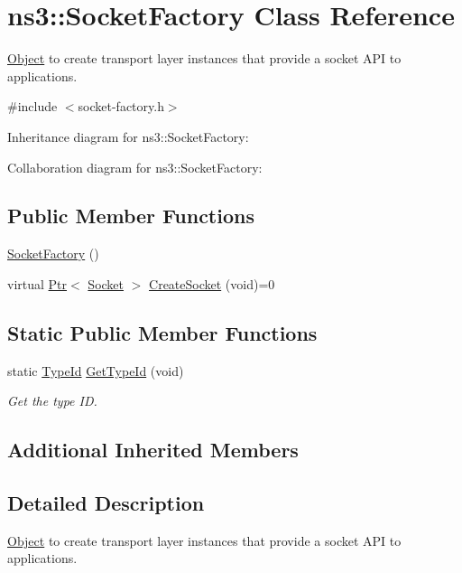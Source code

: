 \hypertarget{classns3_1_1SocketFactory}{}\section{ns3\+:\+:Socket\+Factory Class Reference}
\label{classns3_1_1SocketFactory}


\hyperlink{classns3_1_1Object}{Object} to create transport layer instances that provide a socket A\+PI to applications.  




{\ttfamily \#include $<$socket-\/factory.\+h$>$}



Inheritance diagram for ns3\+:\+:Socket\+Factory\+:


Collaboration diagram for ns3\+:\+:Socket\+Factory\+:
\subsection*{Public Member Functions}
\begin{DoxyCompactItemize}
\item 
\hyperlink{classns3_1_1SocketFactory_a98a41212740c38fb7db9ea698800f8cf}{Socket\+Factory} ()
\item 
virtual \hyperlink{classns3_1_1Ptr}{Ptr}$<$ \hyperlink{classns3_1_1Socket}{Socket} $>$ \hyperlink{classns3_1_1SocketFactory_a97351e6e7860503a4912042530449f62}{Create\+Socket} (void)=0
\end{DoxyCompactItemize}
\subsection*{Static Public Member Functions}
\begin{DoxyCompactItemize}
\item 
static \hyperlink{classns3_1_1TypeId}{Type\+Id} \hyperlink{classns3_1_1SocketFactory_ac8058ed663a63bb513feabd79c5ec3f6}{Get\+Type\+Id} (void)
\begin{DoxyCompactList}\small\item\em Get the type ID. \end{DoxyCompactList}\end{DoxyCompactItemize}
\subsection*{Additional Inherited Members}


\subsection{Detailed Description}
\hyperlink{classns3_1_1Object}{Object} to create transport layer instances that provide a socket A\+PI to applications. 

